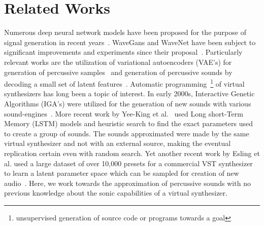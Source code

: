 \documentclass[runningheads,a4paper]{llncs}
\begin{document}
\section{Related Works}
Numerous deep neural network models have been proposed for the purpose of signal generation in recent years~\cite{nsynth2017,yamamoto2020parallel,oord2017parallel,yee2018automatic,ramires2020neural}. WaveGans and WaveNet have been subject to significant improvements and experiments since their proposal~\cite{nsynth2017,yamamoto2020parallel,oord2017parallel}. Particularly relevant works are the utilization of variational autoencoders (VAE's) for generation of percussive samples~\cite{aouameur2019neural} and generation of percussive sounds by decoding a small set of latent features~\cite{ramires2020neural}. Automatic programming~\footnote{unsupervised generation of source code or programs towards a goal} of virtual synthesizers has long been a topic of interest. In early 2000s, Interactive Genetic Algorithms (IGA's) were utilized for the generation of new sounds with various sound-engines~\cite{johnson1999exploring,dahlstedt2001creating}. More recent work by Yee-King et al.~\cite{yee2018automatic} used Long short-Term Memory (LSTM) models and heuristic search to find the exact parameters used to create a group of sounds. The sounds approximated were made by the same virtual synthesizer and not with an external source, making the eventual replication certain even with random search. Yet another recent work by Esling et al. used a large dataset of over 10,000 presets for a commercial VST synthesizer to learn a latent parameter space which can be sampled for creation of new audio~\cite{esling2019universal}. Here, we work towards the approximation of percussive sounds with no previous knowledge about the sonic capabilities of a virtual synthesizer.
\end{document}
